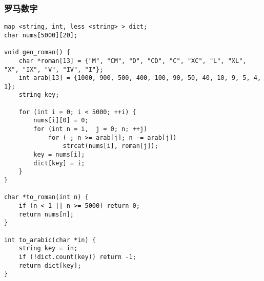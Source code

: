 \subsubsection{罗马数字}
\begin{verbatim}
map <string, int, less <string> > dict;
char nums[5000][20];

void gen_roman() {
	char *roman[13] = {"M", "CM", "D", "CD", "C", "XC", "L", "XL", "X", "IX", "V", "IV", "I"};
	int arab[13] = {1000, 900, 500, 400, 100, 90, 50, 40, 10, 9, 5, 4, 1};
	string key;

	for (int i = 0; i < 5000; ++i) {
		nums[i][0] = 0;
		for (int n = i,  j = 0; n; ++j)
			for ( ; n >= arab[j]; n -= arab[j]) 
				strcat(nums[i], roman[j]);
		key = nums[i];
		dict[key] = i;
	}
}

char *to_roman(int n) {
	if (n < 1 || n >= 5000) return 0;
	return nums[n];
}

int to_arabic(char *in) {
	string key = in;
	if (!dict.count(key)) return -1;
	return dict[key];
}
\end{verbatim}
